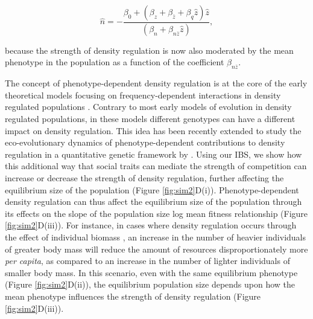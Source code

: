 \documentclass{article}
\begin{document}
	\begin{equation} \label{eq: eq_N_S4}
	\hat{n} = -\frac{\beta_{0}+(\beta_{z}  + \beta_{\bar{z}} + \beta_{q}\hat{z})\hat{z}}{(\beta_{n} +  \beta_{n\bar{z}} \hat{z})},
	\end{equation}
	
	\noindent because the strength of density regulation is now also moderated by the mean phenotype in the population as a function of the coefficient  $\beta_{n\bar{z}}$. 
	
	The concept of phenotype-dependent density regulation is at the core of the early theoretical models focusing on frequency-dependent interactions in density regulated populations \citep{Clarke1972, Anderson1983}. Contrary to most early models of evolution in density regulated populations, in these models different genotypes can have a different impact on density regulation. This idea has been recently extended to study the eco-evolutionary dynamics of phenotype-dependent contributions to density regulation in a quantitative genetic framework by \cite{Engen2020}. Using our IBS, we show how this additional way that social traits can mediate the strength of competition can increase or decrease the strength of density regulation, further affecting the equilibrium size of the population (Figure \ref{fig:sim2}D(i)). Phenotype-dependent density regulation can thus affect the equilibrium size of the population through its effects on the slope of the population size log mean fitness relationship (Figure \ref{fig:sim2}D(iii)). For instance, in cases where density regulation occurs through the effect of individual biomass \citep{Owen-Smith2002}, an increase in the number of heavier individuals of greater body mass will reduce the amount of resources disproportionately more \textit{per capita}, as compared to an increase in the number of lighter individuals  of smaller body mass. In this scenario, even with the same equilibrium phenotype (Figure \ref{fig:sim2}D(ii)), the equilibrium population size depends upon how the mean phenotype influences the strength of density regulation (Figure \ref{fig:sim2}D(iii)). 
	
\end{document}
